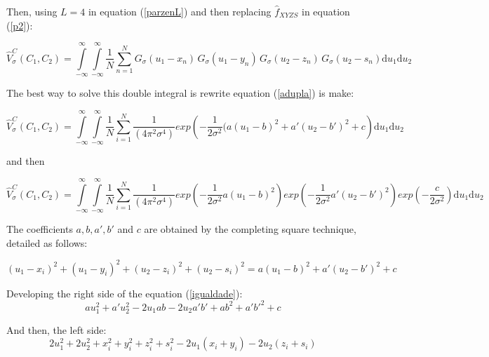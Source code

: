 \documentclass[preprint,12pt]{elsarticle}
\begin{document}
Then, using $L=4$ in equation (\ref{parzenL}) and then replacing $\hat{f}_{XYZS}$ in equation (\ref{p2}):

\begin{equation}\label{adupla}
\hat{V}^{C}_{\sigma}(C_{1},C_{2}) = \int\limits_{-\infty}^{\infty} \int\limits_{-\infty}^{\infty}\frac{1}{N}\sum\limits_{n=1}^N  G_{\sigma}(u_{1}-x_{n}) \, G_{\sigma}(u_{1}-y_{n}) \,G_{\sigma}(u_{2}-z_{n}) \, G_{\sigma}(u_{2}-s_{n})  \mathrm{d}u_{1} \mathrm{d}u_{2} 
\end{equation}



The best way to solve this double integral is rewrite equation (\ref{adupla}) is make:

\begin{equation}\nonumber
\hat{V}^{C}_{\sigma}(C_{1},C_{2}) = \int\limits_{-\infty}^{\infty}\int\limits_{-\infty}^{\infty} \frac{1}{N} \sum\limits_{i=1}^N \frac{1}{(4\pi^{2}\sigma^{4})} exp \left ( - \frac{1}{2\sigma^{2}} ( a(u_1-b)^{2}+ a'(u_2-b')^{2} + c  \right ) \mathrm{d}u_1\mathrm{d}u_2
\end{equation}

and then

\small
\begin{equation}\label{aintegralmae}
\hat{V}^{C}_{\sigma}(C_{1},C_{2}) = \int\limits_{-\infty}^{\infty}\int\limits_{-\infty}^{\infty} \frac{1}{N} \sum\limits_{i=1}^N \frac{1}{(4\pi^{2}\sigma^{4})} exp \left ( - \frac{1}{2\sigma^{2}}  a(u_1-b)^{2} \right) exp \left( - \frac{1}{2\sigma^{2}} a'(u_2-b')^{2} \right)  exp \left( - \frac{c}{2\sigma^{2}} \right ) \mathrm{d}u_1\mathrm{d}u_2
\end{equation}
\normalsize

The coefficients $a,b,a',b'$ and $c$ are obtained by the completing square technique, detailed	 as follows:


\begin{equation}\label{igualdade}
(u_1-x_{i})^{2} + (u_1-y_{i})^{2} + (u_2-z_{i})^{2} + (u_2-s_{i})^{2} = a(u_1-b)^2 + a'(u_2-b')^2 + c 
\end{equation}

Developing the right side of the equation (\ref{igualdade}): 
\begin{equation}\nonumber
au_1^2 + a'u_2^2 - 2u_1ab - 2u_2a'b' + ab^2 + a'b'^2 + c 
\end{equation}

And then, the left side:
\begin{equation}\nonumber
2u_1^2 + 2u_2^2 + x_{i}^2 + y_{i}^2 + z_{i}^2 + s_{i}^2 - 2u_1(x_{i}+y_{i}) - 2u_2(z_{i} + s_{i})
\end{equation}
\end{document}
